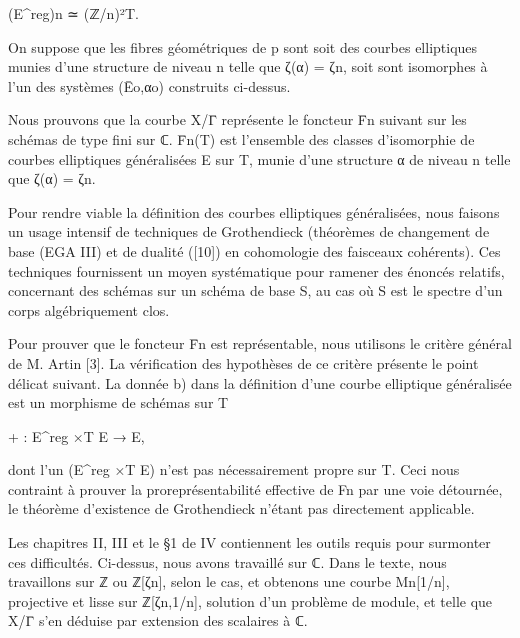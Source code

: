 \documentclass[11pt,a4paper]{article}
\begin{document}
(E\textasciicircum{}reg)\textunderscore{}n ≃ (ℤ/n)²\textunderscore{}T.

On suppose que les fibres géométriques de p sont soit des courbes elliptiques munies d'une structure de niveau n telle que ζ(α) = ζ\textunderscore{}n, soit sont isomorphes à l'un des systèmes (Ē\textunderscore{}o,α\textunderscore{}o) construits ci-dessus.

Nous prouvons que la courbe X/Γ̄ représente le foncteur F̄\textunderscore{}n suivant sur les schémas de type fini sur ℂ. F̄\textunderscore{}n(T) est l'ensemble des classes d'isomorphie de courbes elliptiques généralisées E sur T, munie d'une structure α de niveau n telle que ζ(α) = ζ\textunderscore{}n.

Pour rendre viable la définition des courbes elliptiques généralisées, nous faisons un usage intensif de techniques de Grothendieck (théorèmes de changement de base (EGA III) et de dualité ([10]) en cohomologie des faisceaux cohérents). Ces techniques fournissent un moyen systématique pour ramener des énoncés relatifs, concernant des schémas sur un schéma de base S, au cas où S est le spectre d'un corps algébriquement clos.

Pour prouver que le foncteur F̄\textunderscore{}n est représentable, nous utilisons le critère général de M. Artin [3]. La vérification des hypothèses de ce critère présente le point délicat suivant. La donnée b) dans la définition d'une courbe elliptique généralisée est un morphisme de schémas sur T

+ : E\textasciicircum{}reg ×\textunderscore{}T E → E,

dont l'un (E\textasciicircum{}reg ×\textunderscore{}T E) n'est pas nécessairement propre sur T. Ceci nous contraint à prouver la proreprésentabilité effective de F\textunderscore{}n par une voie détournée, le théorème d'existence de Grothendieck n'étant pas directement applicable.

Les chapitres II, III et le §1 de IV contiennent les outils requis pour surmonter ces difficultés. Ci-dessus, nous avons travaillé sur ℂ. Dans le texte, nous travaillons sur ℤ ou ℤ[ζ\textunderscore{}n], selon le cas, et obtenons une courbe M\textunderscore{}n[1/n], projective et lisse sur ℤ[ζ\textunderscore{}n,1/n], solution d'un problème de module, et telle que X/Γ̄ s'en déduise par extension des scalaires à ℂ.
\end{document}
